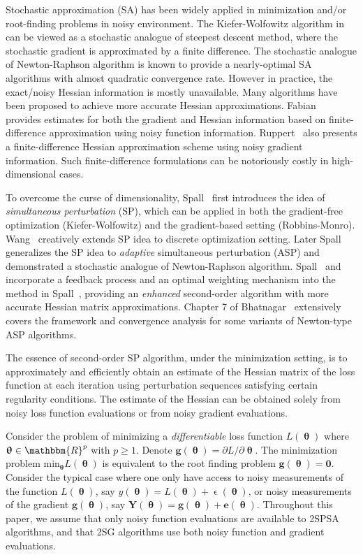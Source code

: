 \documentclass[conference,10.6cpt]{IEEEtran}
\begin{document}
Stochastic approximation (SA) has been widely applied in minimization and/or
root-finding problems in noisy environment. The Kiefer-Wolfowitz algorithm in \cite{Kiefer1952} can be viewed as a stochastic analogue of steepest descent method, where the stochastic gradient is approximated by a finite difference. The stochastic analogue of Newton-Raphson algorithm is known to provide a nearly-optimal SA algorithms with almost quadratic convergence rate. However in practice, the exact/noisy Hessian information is mostly unavailable. Many algorithms have been proposed to achieve more accurate Hessian approximations. Fabian~\cite{Fabian1971} provides estimates for both the gradient and Hessian information based on finite-difference approximation using noisy function information. Ruppert~\cite{Ruppert1985} also presents a finite-difference Hessian approximation scheme using noisy gradient information. Such finite-difference formulations can be notoriously costly in high-dimensional cases. 

To overcome the curse of dimensionality, Spall~\cite{Spall1992} first introduces the idea of \textit{simultaneous perturbation} (SP), which can be applied
in both the gradient-free optimization (Kiefer-Wolfowitz) and the
gradient-based setting (Robbins-Monro).  Wang~\cite{Wang2011} creatively extends SP idea to discrete optimization setting. Later Spall~\cite{Spall2000}
generalizes the SP idea to \textit{adaptive} simultaneous perturbation (ASP) and demonstrated a stochastic
analogue of Newton-Raphson algorithm.  Spall~\cite{Spall2007} and \cite{Spall2009} incorporate a feedback process and an optimal weighting mechanism into the method in Spall~\cite{Spall2000}, providing an
\textit{enhanced} second-order algorithm with more accurate Hessian matrix approximations. Chapter 7 of Bhatnagar~\cite{Bhatnagar2012} extensively covers the framework and convergence analysis for some variants of Newton-type ASP algorithms.

The essence of second-order SP algorithm, under the minimization setting,
is to approximately and efficiently obtain an estimate of the
Hessian matrix of the loss function at each
iteration using perturbation sequences satisfying certain regularity
conditions. The estimate of the Hessian can be obtained solely from
noisy loss function evaluations or from noisy gradient
evaluations.

Consider the problem of minimizing a
\textit{differentiable} loss function $ L(\bm{\uptheta}) $ where
$ \bm{\uptheta} \in \mathbbm{R}^p $ with $ p\ge1 $. Denote
$\bm{g}(\bm{\uptheta})={\partial L}/{\partial \bm{\uptheta}}$. The
minimization problem ${\text{min}}_{\bm{\uptheta}}L(\bm{\uptheta})$ is
equivalent to the root finding problem $\bm{g}(\bm{\uptheta})=\bm{0}$.
Consider the typical case where one only have access to noisy measurements of
the function $ L(\bm{\uptheta}) $, say
$ y(\bm{\uptheta})=L(\bm{\uptheta})+\upvarepsilon(\bm{\uptheta}) $, or
noisy measurements of the gradient $\bm{g}(\bm{\uptheta})$, say
$\bm{Y}(\bm{\uptheta})=\bm{g}(\bm{\uptheta})+\bm{e}(\bm{\uptheta})$. Throughout this paper, we assume that only noisy function
evaluations are available to 2SPSA algorithms, and that 2SG algorithms use both noisy function and gradient evaluations.
\end{document}
